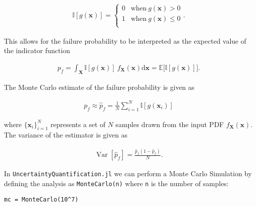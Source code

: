 \begin{equation*}
\begin{split}\mathbb{I}[g(\boldsymbol{x})] =
\begin{cases}
    0 & \text{when} \ g(\boldsymbol{x}) > 0\\
    1 & \text{when} \ g(\boldsymbol{x}) \leq 0\\
\end{cases}.\end{split}\end{equation*}


This allows for the failure probability to be interpreted as the expected value of the indicator function



\begin{equation*}
\begin{split}p_f = \int_{\boldsymbol{X}} \mathbb{I}[g(\boldsymbol{x})]\ f_{\boldsymbol{X}}(\boldsymbol{x}) \mathrm{d} \boldsymbol{x} = \mathbb{E}\big[\mathbb{I}[g(\boldsymbol{x})]\big].\end{split}\end{equation*}


The Monte Carlo estimate of the failure probability is given as



\begin{equation*}
\begin{split}p_f \approx \hat{p}_f = \frac{1}{N} \sum_{i=1}^N \mathbb{I}[g(\boldsymbol{x}_i)]\end{split}\end{equation*}


where \(\{\boldsymbol{x}_i\}_{i=1}^N\) represents a set of \(N\) samples drawn from the input PDF \(f_{\boldsymbol{X}}(\boldsymbol{x})\). The variance of the estimator is given as



\begin{equation*}
\begin{split}\operatorname{Var}[\hat{p}_f] = \frac{\hat{p}_f (1-\hat{p}_f)}{N}.\end{split}\end{equation*}


In \texttt{UncertaintyQuantification.jl} we can perform a Monte Carlo Simulation by defining the analysis as \texttt{MonteCarlo(n)}  where \texttt{n} is the number of samples:




\begin{verbatim}
mc = MonteCarlo(10^7)
\end{verbatim}



